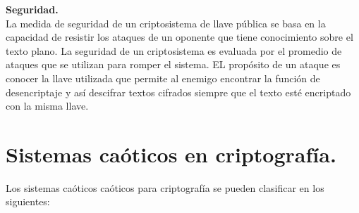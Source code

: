 \documentclass[10pt]{IEEEtran}
\begin{document}
\textbf{Seguridad.}\\
La medida de seguridad de un criptosistema de llave pública se basa en la capacidad de resistir los ataques de un oponente que tiene conocimiento sobre el texto plano. La seguridad de un criptosistema es evaluada por el promedio de ataques que se utilizan para romper el sistema. EL propósito de un ataque es conocer la llave utilizada que permite al enemigo encontrar la función de desencriptaje y así descifrar textos cifrados siempre que el texto esté encriptado con la misma llave.


\section{Sistemas caóticos en criptografía.}
Los sistemas caóticos caóticos para criptografía se pueden clasificar en los siguientes:
\end{document}
